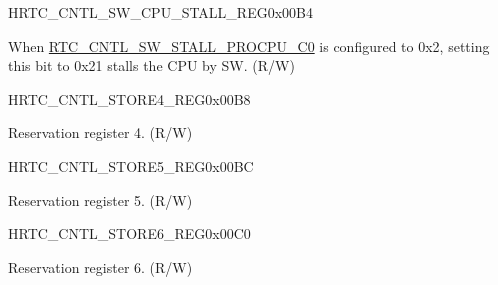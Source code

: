 \begin{register}{H}{RTC\_CNTL\_SW\_CPU\_STALL\_REG}{0x00B4}\label{regdesc:RTCCNTLSWCPUSTALLREG}
%
%
%
\regnewline%
\begin{regdesc}\begin{reglist}
\label{fielddesc:RTCCNTLSWSTALLPROCPUC1}\item [RTC\_CNTL\_SW\_STALL\_PROCPU\_C1] When \hyperref[fielddesc:RTCCNTLSWSTALLPROCPUC0]{RTC\_CNTL\_SW\_STALL\_PROCPU\_C0} is configured to 0x2, setting this bit to 0x21 stalls the CPU by SW. (R/W)
\end{reglist}\end{regdesc}
\end{register}

\begin{register}{H}{RTC\_CNTL\_STORE4\_REG}{0x00B8}\label{regdesc:RTCCNTLSTORE4REG}
%
\regnewline%
\begin{regdesc}\begin{reglist}
\label{fielddesc:RTCCNTLSCRATCH4}\item [RTC\_CNTL\_SCRATCH4] Reservation register 4. (R/W)
\end{reglist}\end{regdesc}
\end{register}


\begin{register}{H}{RTC\_CNTL\_STORE5\_REG}{0x00BC}\label{regdesc:RTCCNTLSTORE5REG}
%
\regnewline%
\begin{regdesc}\begin{reglist}
\label{fielddesc:RTCCNTLSCRATCH5}\item [RTC\_CNTL\_SCRATCH5] Reservation register 5. (R/W)
\end{reglist}\end{regdesc}
\end{register}


\begin{register}{H}{RTC\_CNTL\_STORE6\_REG}{0x00C0}\label{regdesc:RTCCNTLSTORE6REG}
%
\regnewline%
\begin{regdesc}\begin{reglist}
\label{fielddesc:RTCCNTLSCRATCH6}\item [RTC\_CNTL\_SCRATCH6] Reservation register 6. (R/W)
\end{reglist}\end{regdesc}
\end{register}


